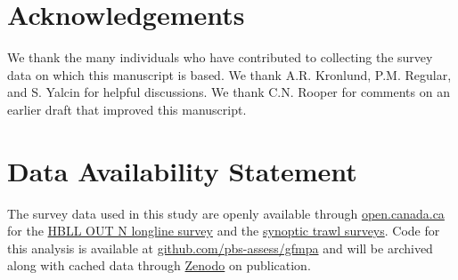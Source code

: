 \documentclass[12pt]{article}
\begin{document}
\begin{spacing}{1.4}



\section*{Acknowledgements}

We thank the many individuals who have contributed to collecting the survey data on which this manuscript is based.
We thank A.R. Kronlund, P.M. Regular, and S. Yalcin for helpful discussions.
We thank C.N. Rooper for comments on an earlier draft that improved this manuscript.

\section*{Data Availability Statement}

The survey data used in this study are openly available through \href{open.canada.ca}{open.canada.ca} for the \href{https://open.canada.ca/data/en/dataset/524fde54-1d93-4d22-bb83-df542780a719}{HBLL OUT N longline survey} and the \href{https://open.canada.ca/data/en/dataset/a278d1af-d567-4964-a109-ae1e84cbd24a}{synoptic trawl surveys}.
Code for this analysis is available at \href{https://github.com/pbs-assess/gfmpa}{github.com/pbs-assess/gfmpa} and will be archived along with cached data through \href{https://zenodo.org/}{Zenodo} on publication.



\end{spacing}
\end{document}

